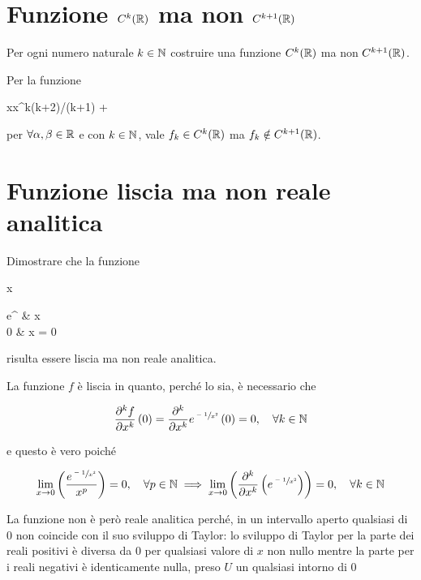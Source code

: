\section{Funzione $ C^{k}(\mathbb{R}) $ ma non $ C^{k+1}(\mathbb{R}) $}\label{es1-1}

\begin{tcolorbox}
	Per ogni numero naturale $ k \in \mathbb{N} $ costruire una funzione $ C^{k}(\mathbb{R}) $ ma non $ C^{k+1}(\mathbb{R}) $.
\end{tcolorbox}

Per la funzione

	{\R}{\R}
	{x}{\alpha x^{k(k+2)/(k+1)} + \beta}

per $ \forall \alpha,\beta \in \mathbb{R} $ e con $ k \in \mathbb{N} $, vale $ f_{k} \in C^{k}(\mathbb{R}) $ ma $ f_{k} \notin C^{k+1}(\mathbb{R}) $.

%

\newpage

%

\section{Funzione liscia ma non reale analitica}\label{es1-2}

\begin{tcolorbox}
	Dimostrare che la funzione
	
		{\R}{\R}
		{x}{%
			\begin{cases}
				e^{} & x \\
				0 & x = 0
			\end{cases}
			}
	
	risulta essere liscia ma non reale analitica.
\end{tcolorbox}

La funzione $ f $ è liscia in quanto, perché lo sia, è necessario che

\begin{equation}
	\pdv[k]{f}{x} \, (0) = \pdv[k]{x} e^{\sfrac{-1}{x^{2}}} \, (0) = 0 \qcomma \forall k \in \N
\end{equation}

e questo è vero poiché

\begin{equation}
	\lim_{x \to 0} \left( \dfrac{e^{\sfrac{-1}{x^{2}}}}{x^{p}} \right) = 0 \qcomma \forall p \in \N %
	\implies%
	\lim_{x \to 0} \left( \pdv[k]{x} \left( e^{\sfrac{-1}{x^{2}}} \right) \right) = 0 \qcomma \forall k \in \N
\end{equation}

La funzione non è però reale analitica perché, in un intervallo aperto qualsiasi di 0 non coincide con il suo sviluppo di Taylor: lo sviluppo di Taylor per la parte dei reali positivi è diversa da 0 per qualsiasi valore di $ x $ non nullo mentre la parte per i reali negativi è identicamente nulla, \ie preso $ U $ un qualsiasi intorno di 0

